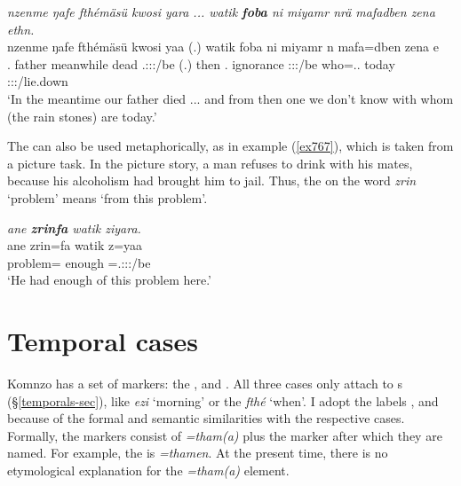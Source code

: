 \begin{exe}
	\ex \emph{nzenme ŋafe fthémäsü kwosi yara ... watik \textbf{foba} ni miyamr nrä mafadben zena ethn.}\\
	\gll nzenme ŋafe fthémäsü kwosi yaa (.) watik foba ni miyamr n mafa=dben zena e\\
	\Fnsg.{\Poss} father meanwhile dead \Tsg.\Masc:\Sbj:\Pst:\Ipfv/be (.) then \Dist.{\Abl} {\Fnsg} ignorance \Fpl:\Sbj:\Nonpast:\Ipfv/be who=\Loc.\Anim.{\Sg} today \Stpl:\Sbj:\Nonpast:\Ipfv/lie.down\\
	\trans `In the meantime our father died ... and from then one we don't know with whom (the rain stones) are today.'
	\label{ex711}
\end{exe}

The  can also be used metaphorically, as in example (\ref{ex767}), which is taken from a picture task. In the picture story, a man refuses to drink with his mates, because his alcoholism had brought him to jail. Thus, the  on the word \emph{zrin} `problem' means `from this problem'.

\begin{exe}
	\ex \emph{ane \textbf{zrinfa} watik ziyara.}\\
	\gll ane zrin=fa watik z=yaa\\
	{\Dem} problem={\Abl} enough \Prox=\Tsg.\Masc:\Sbj:\Pst:\Ipfv/be\\
	\trans `He had enough of this problem here.'
	\label{ex767}
\end{exe}

\section{Temporal cases}\label{temporalcase}

Komnzo has a set of   markers: the  ,  and . All three  cases only attach to  s ({\S}\ref{temporals-sec}), like \emph{ezi} `morning' or the  \emph{fthé} `when'. I adopt the labels ,  and  because of the formal and semantic similarities with the respective cases. Formally, the   markers consist of \emph{=tham(a)} plus the  marker after which they are named. For example, the   is \emph{=thamen}. At the present time, there is no etymological explanation for the \emph{=tham(a)} element.
   
